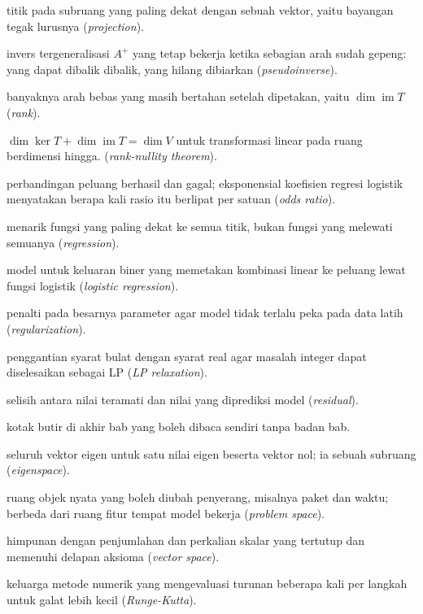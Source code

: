 \begin{description}[style=nextline,itemsep=0.35em]
  \item[Proyeksi] titik pada subruang yang paling dekat dengan sebuah vektor, yaitu bayangan tegak lurusnya (\emph{projection}).
  \item[Pseudoinvers] invers tergeneralisasi $A^{+}$ yang tetap bekerja ketika sebagian arah sudah gepeng: yang dapat dibalik dibalik, yang hilang dibiarkan (\emph{pseudoinverse}).
  \item[Rank] banyaknya arah bebas yang masih bertahan setelah dipetakan, yaitu $\dim\operatorname{im}T$ (\emph{rank}).
  \item[Rank-nullity] $\dim\ker T+\dim\operatorname{im}T=\dim V$ untuk transformasi linear pada ruang berdimensi hingga. (\emph{rank-nullity theorem}).
  \item[Rasio peluang] perbandingan peluang berhasil dan gagal; eksponensial koefisien regresi logistik menyatakan berapa kali rasio itu berlipat per satuan (\emph{odds ratio}).
  \item[Regresi] menarik fungsi yang paling dekat ke semua titik, bukan fungsi yang melewati semuanya (\emph{regression}).
  \item[Regresi logistik] model untuk keluaran biner yang memetakan kombinasi linear ke peluang lewat fungsi logistik (\emph{logistic regression}).
  \item[Regularisasi] penalti pada besarnya parameter agar model tidak terlalu peka pada data latih (\emph{regularization}).
  \item[Relaksasi LP] penggantian syarat bulat dengan syarat real agar masalah integer dapat diselesaikan sebagai LP (\emph{LP relaxation}).
  \item[Residu] selisih antara nilai teramati dan nilai yang diprediksi model (\emph{residual}).
  \item[Ringkasan] kotak butir di akhir bab yang boleh dibaca sendiri tanpa badan bab.
  \item[Ruang eigen] seluruh vektor eigen untuk satu nilai eigen beserta vektor nol; ia sebuah subruang (\emph{eigenspace}).
  \item[Ruang masalah] ruang objek nyata yang boleh diubah penyerang, misalnya paket dan waktu; berbeda dari ruang fitur tempat model bekerja (\emph{problem space}).
  \item[Ruang vektor] himpunan dengan penjumlahan dan perkalian skalar yang tertutup dan memenuhi delapan aksioma (\emph{vector space}).
  \item[Runge-Kutta] keluarga metode numerik yang mengevaluasi turunan beberapa kali per langkah untuk galat lebih kecil (\emph{Runge-Kutta}).

\end{description}
